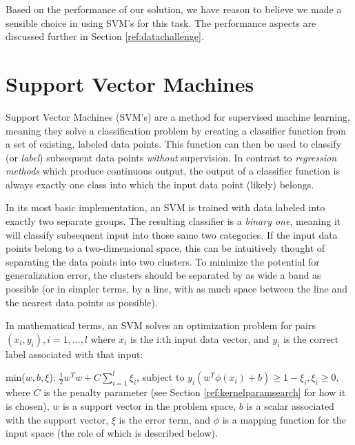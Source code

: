 \documentclass{netsec2012}
\begin{document}
Based on the performance of our solution, we have reason to believe we made a sensible choice in
using SVM's for this task.  The performance aspects are discussed further in Section
\ref{ref:datachallenge}.


\section{Support Vector Machines}

\label{ref:svmintro}

Support Vector Machines (SVM's) are a method for supervised machine learning, meaning they solve a
classification problem by creating a classifier function from a set of existing, labeled data
points.  This function can then be used to classify (or \emph{label}) subsequent data points
\emph{without} supervision.  In contrast to \emph{regression methods} which produce continuous
output, the output of a classifier function is always exactly one class into which the input data
point (likely) belongs.

In its most basic implementation, an SVM is trained with data labeled into exactly two separate
groups.  The resulting classifier is a \emph{binary one}, meaning it will classify subsequent input
into those same two categories.  If the input data points belong to a two-dimensional space, this
can be intuitively thought of separating the data points into two clusters.  To minimize the
potential for generalization error, the clusters should be separated by as wide a band as possible
(or in simpler terms, by a line, with as much space between the line and the nearest data points as
possible). \cite{svm_chemistry}

In mathematical terms, an SVM solves an optimization problem for pairs
$(x_i, y_i), i = 1, ..., l$ where $x_i$ is the i:th input data vector, and $y_i$ is the correct
label associated with that input:

min($w,b,\xi$): $\frac{1}{2}w^Tw + C \sum_{i=1}^l\xi_i$,
subject to $y_i(w^T \phi(x_i) + b) \ge 1 - \xi_i, \xi_i \ge 0$,
where $C$ is the penalty parameter (see Section \ref{ref:kernelparamsearch} for how it is chosen),
$w$ is a support vector in the problem space, $b$ is a scalar associated with the support vector,
$\xi$ is the error term, and $\phi$ is a mapping function for the input space (the role of which is
described below). \cite{libsvm_guide,cortes1995support}
\end{document}
